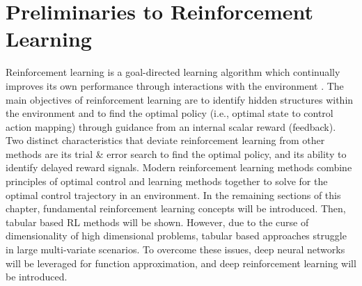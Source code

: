 
\section{Preliminaries to Reinforcement Learning}

Reinforcement learning is a goal-directed learning algorithm which continually improves its own performance through interactions with the environment \cite{sutton}. The main objectives of reinforcement learning are to identify hidden structures within the environment and to find the optimal policy (i.e., optimal state to control action mapping) through guidance from an internal scalar reward (feedback). Two distinct characteristics that deviate reinforcement learning from other methods are its trial \& error search to find the optimal policy, and its ability to identify delayed reward signals. Modern reinforcement learning methods combine principles of optimal control and learning methods together to solve for the optimal control trajectory in an environment.  In the remaining sections of this chapter, fundamental reinforcement learning concepts will be introduced.  Then, tabular based RL methods will be shown.  However, due to the curse of dimensionality of high dimensional problems, tabular based approaches struggle in large multi-variate scenarios.  To overcome these issues, deep neural networks will be leveraged for function approximation, and deep reinforcement learning will be introduced.


